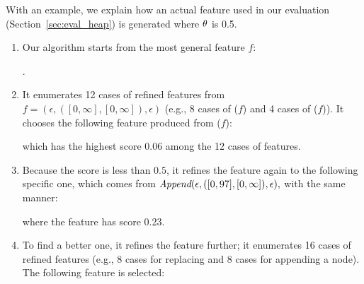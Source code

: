 With an example, we explain how an actual feature used in our evaluation (Section~\ref{sec:eval_heap}) is generated where ${\theta}$ is 0.5.
\begin{enumerate}
\item Our algorithm starts from the most general feature $f$:
\begin{center}
.
\end{center}
\item It enumerates 12 cases of refined features from $f = (\epsilon,([0,\infty],[0,\infty]),\epsilon)$ (e.g., 8 cases of \Append($f$) and 4 cases of \Replace($f$)).
It chooses the following feature produced from \Replace($f$):
\begin{center}
\end{center}
 which has the highest score 0.06 among the 12 cases of features.
\item Because the score is less than $0.5$,
it refines the feature again to the following specific one, which comes from ${\textit{Append}}(\epsilon,([0,97],[0,\infty]),\epsilon),$ with the same manner:
\begin{center}
\end{center}
where the feature has score 0.23.
\item To find a better one, it refines the feature further; it enumerates 16 cases of refined features (e.g., 8 cases for replacing and 8 cases for appending a node). The following feature is selected:
\begin{center}
\end{center}
\end{enumerate}
